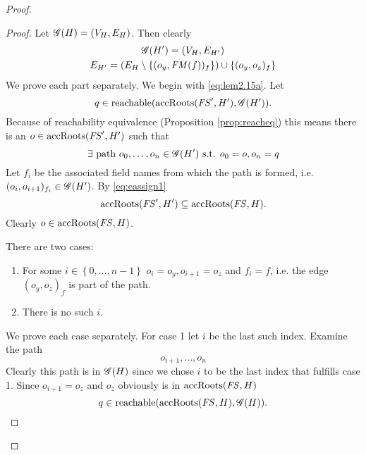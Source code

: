 \begin{proof}
\begin{description}
\begin{description}
\begin{description}
              \begin{proof}
                Let $\mathscr{G}(H) = (V_H, E_H)$. Then clearly
                \begin{equation}
                  \begin{gathered}
                    \mathscr{G}(H') = (V_H, E_{H'}) \\
                    E_{H'} = (E_H \setminus \{(o_y, \mathit{FM}(f))_f \}) \cup \{(o_y,
                    o_z)_f \}
                  \end{gathered}
                \end{equation}
                We prove each part separately.  We begin with
                \eqref{eq:lem2.15a}.  Let
                \begin{equation*}
                  q \in \mbox{$\mathrm{reachable}$}(\mbox{$\mathrm{accRoots}$}(\mathit{FS}', H'), \mathscr{G}(H')).
                \end{equation*}
                Because of reachability equivalence (Proposition
                \ref{prop:reacheq}) this means there is an $o \in \mbox{$\mathrm{accRoots}$}(\mathit{FS}',
                H')$ such that
                \begin{equation}
                  \exists \text{ path } o_0, \dots, o_n \in \mathscr{G}(H')
                  \text{ s.t. } o_0 = o, o_n = q
                \end{equation}
                Let $f_i$ be the associated field names from which the path is
                formed, i.e. $(o_i, o_{i+1})_{f_i} \in \mathscr{G}(H')$.
                By \eqref{eq:eassign1}
                \begin{equation}
                  \mbox{$\mathrm{accRoots}$}(\mathit{FS}', H') \subseteq \mbox{$\mathrm{accRoots}$}(\mathit{FS}, H).
                \end{equation}
                Clearly $o \in \mbox{$\mathrm{accRoots}$}(\mathit{FS}, H)$.

                There are two cases:
                \begin{enumerate}
                  \item For some $i \in \left\{ 0, \dots, n-1 \right\}$ $o_i =
                    o_y, o_{i+1} = o_z$ and $f_i = f$, i.e. the edge $(o_y,
                    o_z)_{f}$ is part of the path.
                  \item There is no such $i$.
                \end{enumerate}
                We prove each case separately. For case 1 let $i$ be the last
                such index. Examine the path 
                \begin{equation}
                  o_{i+1}, \dots, o_n
                \end{equation}
                Clearly this path is in $\mathscr{G}(H)$ since we chose $i$ to be the
                last index that fulfills case 1.  Since $o_{i+1} = o_z$ and
                $o_z$ obviously is in $\mbox{$\mathrm{accRoots}$}(\mathit{FS}, H)$
                \begin{equation}
                  q \in \mbox{$\mathrm{reachable}$}(\mbox{$\mathrm{accRoots}$}(\mathit{FS}, H), \mathscr{G}(H)).
                \end{equation}


\end{proof}
\end{description}
\end{description}
\end{description}
\end{proof}
